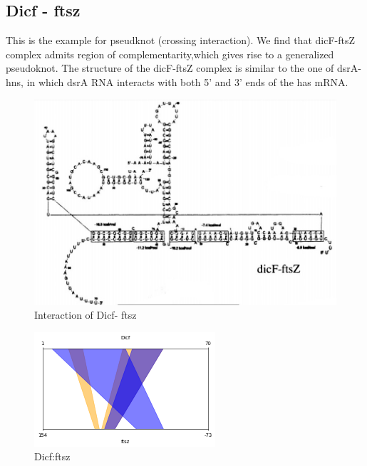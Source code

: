 \documentclass[twoside,a4paper]{report}
\begin{document}
\clearpage
	
%	
	
	\subsection{Dicf - ftsz }
	
	This is the example for pseudknot (crossing interaction). We find that dicF-ftsZ complex admits region of complementarity,which gives rise to a generalized pseudoknot. The structure of the dicF-ftsZ complex is similar to the one of dsrA-hns, in which dsrA RNA interacts with both 5' and 3' ends of the has mRNA.   
	
		\begin{figure}[h!tb]
		\includegraphics[width=1.0\linewidth]{dicf}
		\centering
		\caption{ Interaction of Dicf- ftsz } 
		\label{fig:dicf}
	\end{figure}

\begin{figure}[h!tb]
	\centering
	\includegraphics[width=.4\linewidth]{dic}
	\caption{Dicf:ftsz}
	\label{fig:dic}
\end{figure}
\end{document}
